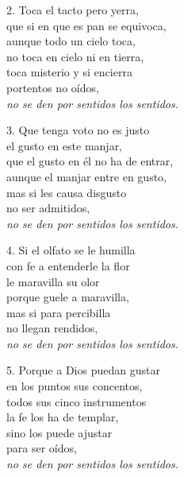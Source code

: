\begin{blocklyrics}
2. Toca el tacto pero yerra,\\
que si en que es pan se equivoca,\\
aunque todo un cielo toca,\\
no toca en cielo ni en tierra,\\
toca misterio y si encierra\\
portentos no oídos,\\
\emph{no se den por sentidos los sentidos.}

3. Que tenga voto no es justo\\
el gusto en este manjar,\\
que el gusto en él no ha de entrar,\\
aunque el manjar entre en gusto,\\
mas si les causa disgusto\\
no ser admitidos,\\
\emph{no se den por sentidos los sentidos.}

4. Si el olfato se le humilla\\
con fe a entenderle la flor\\
le maravilla su olor\\
porque guele a maravilla,\\
mas si para percibilla\\
no llegan rendidos,\\
\emph{no se den por sentidos los sentidos.}

5. Porque a Dios puedan gustar\\
en los puntos sus concentos,\\
todos sus cinco instrumentos\\
la fe los ha de templar,\\
sino los puede ajustar\\
para ser oídos,\\
\emph{no se den por sentidos los sentidos.}
\end{blocklyrics}
